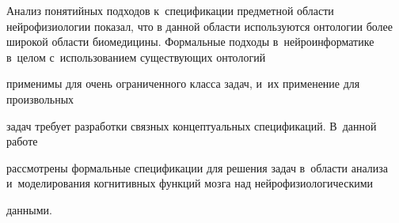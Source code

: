       

      Анализ понятийных подходов к~спецификации предметной области нейрофизиологии показал, что в данной области используются онтологии более широкой области биомедицины. Формальные подходы в~нейроинформатике в~целом с~использованием существующих онтологий 

      применимы для очень ограниченного класса задач, и~их применение для произвольных 

      задач требует разработки связных концептуальных спецификаций. В~данной работе 

рассмотрены формальные спецификации для решения задач в~области анализа и~моделирования когнитивных функций мозга над нейрофизиологическими 

данными.

      

